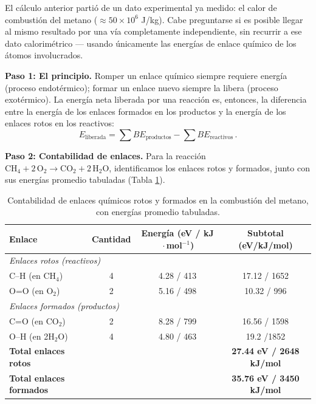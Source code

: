 \documentclass[11pt,a4paper]{book}
\begin{document}
El cálculo anterior partió de un dato experimental ya medido: el calor de combustión
del metano ($\approx 50\times10^6$ J/kg). Cabe preguntarse si es posible llegar al mismo
resultado por una vía completamente independiente, sin recurrir a ese dato calorimétrico
--- usando únicamente las energías de enlace químico de los átomos involucrados.

\medskip
\noindent\textbf{Paso 1: El principio.} Romper un enlace químico siempre requiere energía
(proceso endotérmico); formar un enlace nuevo siempre la libera (proceso exotérmico). La
energía neta liberada por una reacción es, entonces, la diferencia entre la energía de
los enlaces formados en los productos y la energía de los enlaces rotos en los reactivos:
\begin{equation}
    E_{\text{liberada}} = \sum BE_{\text{productos}} - \sum BE_{\text{reactivos}}\,.
\end{equation}

\medskip
\noindent\textbf{Paso 2: Contabilidad de enlaces.} Para la reacción
$\mathrm{CH_4 + 2\,O_2 \rightarrow CO_2 + 2\,H_2O}$, identificamos los enlaces rotos y
formados, junto con sus energías promedio tabuladas (Tabla \ref{tab:enlaces-metano}).

\begin{table}[h]
\centering
\begin{tabular}{lccc}
\hline
\textbf{Enlace} & \textbf{Cantidad} & \textbf{Energía (eV / kJ$\!\cdot\!$mol$^{-1}$)} & \textbf{Subtotal (eV/kJ/mol)} \\
\hline
\multicolumn{4}{l}{\textit{Enlaces rotos (reactivos)}} \\
C--H (en CH$_4$)   & 4 & 4.28 / 413 & 17.12 / 1652 \\
O=O (en O$_2$)     & 2 & 5.16 / 498 & 10.32 / 996 \\
\hline
\multicolumn{4}{l}{\textit{Enlaces formados (productos)}} \\
C=O (en CO$_2$)    & 2 & 8.28 / 799 & 16.56 / 1598 \\
O--H (en 2H$_2$O)   & 4 & 4.80 / 463 & 19.2 /1852 \\
\hline
\textbf{Total enlaces rotos}    & & & \textbf{27.44 eV / 2648 kJ/mol} \\
\textbf{Total enlaces formados} & & & \textbf{35.76 eV / 3450 kJ/mol} \\
\hline
\end{tabular}
\caption{Contabilidad de enlaces químicos rotos y formados en la combustión del metano,
con energías promedio tabuladas.}
\label{tab:enlaces-metano}
\end{table}
\end{document}
